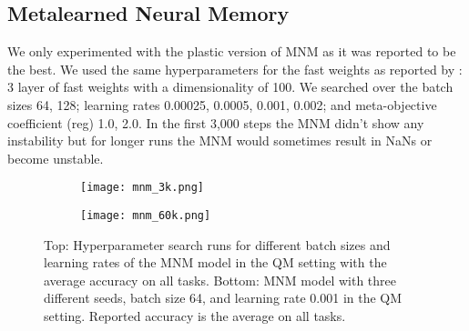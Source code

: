 \documentclass{article} \usepackage{iclr2021_conference,times}
\begin{document}
\subsection{Metalearned Neural Memory}
We only experimented with the plastic version of MNM as it was reported to be the best. We used the same hyperparameters for the fast weights as reported by \citet{munkhdalai2019metalearned}: 3 layer of fast weights with a dimensionality of 100. We searched over the batch sizes 64, 128; learning rates 0.00025, 0.0005, 0.001, 0.002; and meta-objective coefficient (reg) 1.0, 2.0. In the first 3,000 steps the MNM didn't show any instability but for longer runs the MNM would sometimes result in NaNs or become unstable.
\begin{figure}[H]
  \centering
\begin{subfigure}[b]{\linewidth}
    \texttt{[image: mnm\_3k.png]}
  \end{subfigure}
  \begin{subfigure}[b]{\linewidth}
    \texttt{[image: mnm\_60k.png]}
  \end{subfigure}
  \caption{Top: Hyperparameter search runs for different batch sizes and learning rates of the MNM model in the QM setting with the average accuracy on all tasks. Bottom: MNM model with three different seeds, batch size 64, and learning rate 0.001 in the QM setting. Reported accuracy is the average on all tasks.}
  \label{appendix:fig:mnm}
\end{figure}
\end{document}

